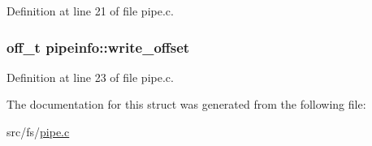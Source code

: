 Definition at line 21 of file pipe.\+c.

\hypertarget{structpipeinfo_abb510c9ed7b4d0bc60432bcc04e3962b}{
\subsubsection[{write\+\_\+offset}]{\setlength{\rightskip}{0pt plus 5cm}off\+\_\+t pipeinfo\+::write\+\_\+offset}}\label{structpipeinfo_abb510c9ed7b4d0bc60432bcc04e3962b}


Definition at line 23 of file pipe.\+c.



The documentation for this struct was generated from the following file\+:\begin{DoxyCompactItemize}
\item 
src/fs/\hyperlink{fs_2pipe_8c}{pipe.\+c}\end{DoxyCompactItemize}
